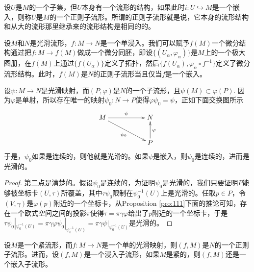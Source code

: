 \para 设$U$是$M$的一个子集，但$U$本身有一个流形的结构，如果此时$i:U\hookrightarrow M$是一个嵌入，则称$U$是$M$的一个正则子流形。所谓的正则子流形就是说，它本身的流形结构和从大的流形那里继承来的流形结构是相同的的。

设$M$和$N$是光滑流形，$f:M\to N$是一个单浸入。我们可以赋予$f(M)$一个微分结构通过把$f:M\to f(M)$做成一个微分同胚，即设$\{(U_\alpha,\varphi_\alpha)\}$是$M$上的一个极大图册，在$f(M)$上通过$\{f(U_\alpha)\}$定义了拓扑，然后$\{f(U_\alpha),\varphi_\alpha\circ f^{-1}\}$定义了微分流形结构。此时，$f(M)$是$N$的正则子流形当且仅当$f$是一个嵌入。

\begin{pro}
设$\psi:M\to N$是光滑映射，而$(P,\varphi)$是$N$的一个子流形，且$\psi(M)\subset \varphi(P)$. 因为$\varphi$是单射，所以存在唯一的映射$\psi_0:N\to P$使得$\varphi\psi_0=\psi$，正如下面交换图所示
\[
\begin{xy}
	\xymatrix{
		M\ar[rr]^\psi\ar[rrd]_{\psi_0}&&N\\
		&&P\ar[u]_\varphi
	}
\end{xy}
\]
于是，$\psi_0$如果是连续的，则他就是光滑的。如果$\psi$是嵌入，则$\psi_0$是连续的，进而是光滑的。
\end{pro}

\begin{proof}
	第二点是清楚的。假设$\psi_0$是连续的，为证明$\psi_0$是光滑的，我们只要证明$P$能够被坐标卡$(U,\tau)$所覆盖，其中$\tau\psi_0$限制在$\psi_0^{-1}(U)$上是光滑的。任取$p\in P$，令$(V,\gamma)$是$\varphi(p)$附近的一个坐标卡，从Proposition \eqref{pro:111}下面的推论可知，存在一个欧式空间之间的投影$\pi$使得$\tau=\pi\gamma\varphi$给出了$p$附近的一个坐标卡，于是$\tau\psi_0|_{\psi_0^{-1}(U)}=\pi\gamma\varphi\psi_0|_{\psi_0^{-1}(U)}=\pi\gamma\psi|_{\psi_0^{-1}(U)}$是光滑的。
\end{proof}

\begin{pro}
设$M$是一个紧流形，而$f:M\to N$是一个单的光滑映射，则$(f,M)$是$N$的一个正则子流形。进而，设$(f,M)$是一个浸入子流形，如果$M$是紧的，则$(f,M)$还是一个嵌入子流形。
\end{pro}

